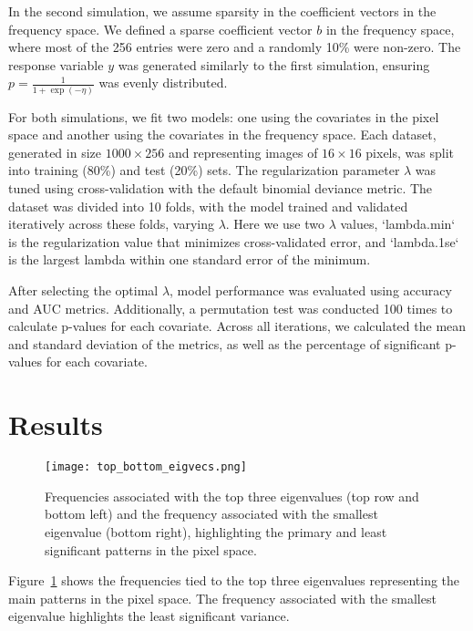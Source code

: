 \documentclass[12pt]{article}
\begin{document}
In the second simulation, we assume sparsity in the coefficient vectors in the
frequency space. We defined a sparse coefficient vector \( b \) in the
frequency space, where most of the 256 entries were zero and a randomly 10\%
were non-zero. The response variable \( y \) was generated similarly to the
first simulation, ensuring \( p = \frac{1}{1 + \exp(-\eta)} \) was evenly
distributed.

For both simulations, we fit two models: one using the covariates in the pixel
space and another using the covariates in the frequency space. Each dataset,
generated in size \( 1000 \times 256 \) and representing images of \( 16 \times
16 \) pixels, was split into training (80\%) and test (20\%) sets. The
regularization parameter \( \lambda \) was tuned using cross-validation with
the default binomial deviance metric. The dataset was divided into 10 folds,
with the model trained and validated iteratively across these folds, varying \(
\lambda \). Here we use two \( \lambda \) values, `lambda.min` is the
regularization value that minimizes cross-validated error, and `lambda.1se` is
the largest lambda within one standard error of the minimum.

After selecting the optimal \( \lambda \), model performance was evaluated
using accuracy and AUC metrics. Additionally, a permutation test was conducted
100 times to calculate p-values for each covariate. Across all iterations, we
calculated the mean and standard deviation of the metrics, as well as the
percentage of significant p-values for each covariate.


\section*{Results}


\begin{figure}[H] 
	\centering
	\texttt{[image: top\_bottom\_eigvecs.png]} 
\caption{Frequencies associated with the top three eigenvalues (top row and
bottom left) and the frequency associated with the smallest eigenvalue (bottom
right), highlighting the primary and least significant patterns in the pixel
space.}
	\label{fig:top_bottom_eigvecs} 
\end{figure}

Figure~\ref*{fig:top_bottom_eigvecs} shows the frequencies tied to the top
three eigenvalues representing the main patterns in the pixel space. The
frequency associated with the smallest eigenvalue highlights the least
significant variance.
\end{document}
